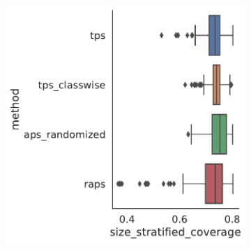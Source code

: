 \begin{figure}
\begin{subfigure}{0.48\linewidth}
        \includegraphics[width=\linewidth,alt={Box plots for method comparison on CiteSeer dataset size stratified coverage.}]{graphConformal/figures/split/citeseer_size_stratified_coverage.png} 
     \end{subfigure}


\end{figure}
